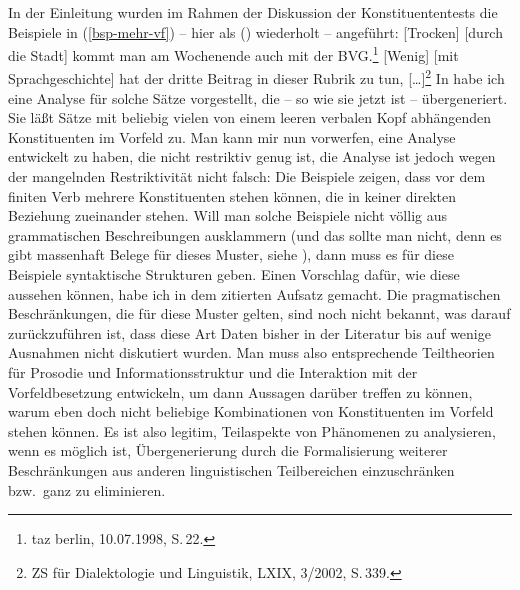 In der Einleitung wurden im Rahmen der Diskussion der Konstituententests die Beispiele
in (\ref{bsp-mehr-vf}) -- hier als () wiederholt -- angeführt:
\eal
\ex {}[Trocken] [durch die Stadt] kommt man am Wochenende auch mit der BVG.\footnote{
        taz berlin, 10.07.1998, S.\,22.
      }
\ex {}[Wenig] [mit Sprachgeschichte] hat der dritte Beitrag in dieser Rubrik zu tun, [\ldots]\footnote{
  ZS für Dialektologie und Linguistik, LXIX, 3/2002, S.\,339.
}
\zl
In  habe ich eine Analyse für solche Sätze vorgestellt, die -- so wie sie jetzt ist --
übergeneriert. Sie läßt Sätze mit beliebig vielen von einem leeren verbalen Kopf abhängenden
Konstituenten im Vorfeld zu. Man kann mir nun vorwerfen, eine Analyse entwickelt zu haben,
die nicht restriktiv genug ist, die Analyse ist jedoch wegen der mangelnden Restriktivität 
nicht falsch: Die Beispiele zeigen, dass vor dem finiten Verb mehrere Konstituenten stehen können,
die in keiner direkten Beziehung zueinander stehen. Will man solche Beispiele nicht völlig aus grammatischen
Beschreibungen ausklammern (und das sollte man nicht, denn es gibt massenhaft Belege für dieses Muster,
siehe ), dann muss es für diese Beispiele syntaktische Strukturen geben. Einen
Vorschlag dafür, wie diese aussehen können, habe ich in dem zitierten Aufsatz gemacht. Die pragmatischen
Beschränkungen, die für diese Muster gelten, sind noch nicht bekannt, was darauf zurückzuführen ist, dass
diese Art Daten bisher in der Literatur bis auf wenige Ausnahmen nicht diskutiert wurden. Man muss
also entsprechende Teiltheorien für Prosodie und Informationsstruktur und die Interaktion mit
der Vorfeldbesetzung entwickeln, um dann Aussagen darüber treffen zu können, warum eben doch nicht
beliebige Kombinationen von Konstituenten im Vorfeld stehen können.
Es ist also legitim, Teilaspekte von Phänomenen zu analysieren, wenn es möglich ist, Übergenerierung
durch die Formalisierung weiterer Beschränkungen aus anderen linguistischen Teilbereichen einzuschränken bzw.\
ganz zu eliminieren.

